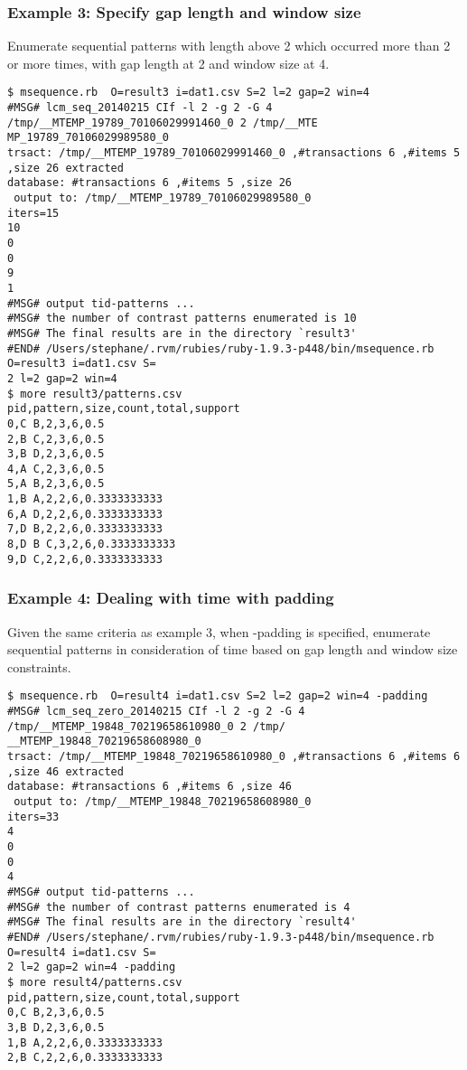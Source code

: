 \subsubsection*{Example 3: Specify gap length and window size}

Enumerate sequential patterns with length above 2 which occurred more than 2 or more times, with gap length at 2 and window size at 4.


\begin{Verbatim}[baselinestretch=0.7,frame=single]
$ msequence.rb  O=result3 i=dat1.csv S=2 l=2 gap=2 win=4
#MSG# lcm_seq_20140215 CIf -l 2 -g 2 -G 4 /tmp/__MTEMP_19789_70106029991460_0 2 /tmp/__MTE
MP_19789_70106029989580_0
trsact: /tmp/__MTEMP_19789_70106029991460_0 ,#transactions 6 ,#items 5 ,size 26 extracted 
database: #transactions 6 ,#items 5 ,size 26
 output to: /tmp/__MTEMP_19789_70106029989580_0
iters=15
10
0
0
9
1
#MSG# output tid-patterns ...
#MSG# the number of contrast patterns enumerated is 10
#MSG# The final results are in the directory `result3'
#END# /Users/stephane/.rvm/rubies/ruby-1.9.3-p448/bin/msequence.rb O=result3 i=dat1.csv S=
2 l=2 gap=2 win=4
$ more result3/patterns.csv
pid,pattern,size,count,total,support
0,C B,2,3,6,0.5
2,B C,2,3,6,0.5
3,B D,2,3,6,0.5
4,A C,2,3,6,0.5
5,A B,2,3,6,0.5
1,B A,2,2,6,0.3333333333
6,A D,2,2,6,0.3333333333
7,D B,2,2,6,0.3333333333
8,D B C,3,2,6,0.3333333333
9,D C,2,2,6,0.3333333333
\end{Verbatim}
\subsubsection*{Example 4: Dealing with time with padding}

Given the same criteria as example 3, when -padding is specified, enumerate sequential patterns in consideration of time based on gap length and window size constraints.


\begin{Verbatim}[baselinestretch=0.7,frame=single]
$ msequence.rb  O=result4 i=dat1.csv S=2 l=2 gap=2 win=4 -padding
#MSG# lcm_seq_zero_20140215 CIf -l 2 -g 2 -G 4 /tmp/__MTEMP_19848_70219658610980_0 2 /tmp/
__MTEMP_19848_70219658608980_0
trsact: /tmp/__MTEMP_19848_70219658610980_0 ,#transactions 6 ,#items 6 ,size 46 extracted 
database: #transactions 6 ,#items 6 ,size 46
 output to: /tmp/__MTEMP_19848_70219658608980_0
iters=33
4
0
0
4
#MSG# output tid-patterns ...
#MSG# the number of contrast patterns enumerated is 4
#MSG# The final results are in the directory `result4'
#END# /Users/stephane/.rvm/rubies/ruby-1.9.3-p448/bin/msequence.rb O=result4 i=dat1.csv S=
2 l=2 gap=2 win=4 -padding
$ more result4/patterns.csv
pid,pattern,size,count,total,support
0,C B,2,3,6,0.5
3,B D,2,3,6,0.5
1,B A,2,2,6,0.3333333333
2,B C,2,2,6,0.3333333333
\end{Verbatim}

